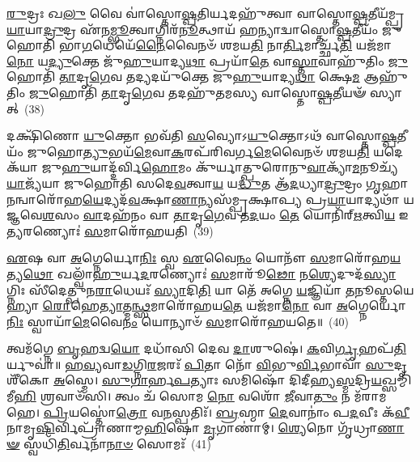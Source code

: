 \-\ul{𑌰𑍁}\-𑌦𑍍𑌰𑌃 𑌖\-\ul{𑌲𑍁} 𑌵𑍈 𑌵𑌾॑𑌸𑍍𑌤𑍋\-\ul{𑌷𑍍𑌪}\-𑌤𑌿𑌰𑍍𑌯𑌦𑌹𑍁᳴𑌤𑍍𑌵𑌾 𑌵𑌾𑌸𑍍𑌤𑍋\-\ul{𑌷𑍍𑌪}\-𑌤𑍀𑌯᳴𑌮𑍍𑌪𑍍𑌰\-\ul{𑌯𑌾}\-𑌯𑌾\-\ul{𑌦𑍍𑌰𑍁}\-𑌦𑍍𑌰 𑌏᳴𑌨\-\ul{𑌮𑍍𑌭𑍂}\-𑌤𑍍𑌵𑌾𑌗𑍍𑌨𑌿𑌰᳴\-\ul{𑌨𑍂}\-𑌤𑍍𑌥𑌾𑌯᳴ 𑌹𑌨𑍍𑌯𑌾𑌦𑍍𑌵𑌾𑌸𑍍𑌤𑍋\-\ul{𑌷𑍍𑌪}\-𑌤𑍀𑌯𑌂᳴ 𑌜𑍁𑌹𑍋𑌤𑌿 𑌭𑌾\-\ul{𑌗}\-𑌧𑍇𑌯𑍇᳴\-\ul{𑌨𑍈}\-𑌵𑍈𑌨𑍞᳴ 𑌶𑌮𑌯\-\ul{𑌤𑌿} 𑌨𑌾\-\ul{𑌰𑍍𑌤𑌿}\-𑌮𑌾𑌰𑍍𑌚𑍍𑌛᳴\-\ul{𑌤𑌿} 𑌯𑌜᳴𑌮𑌾\-\ul{𑌨𑍋} 𑌯\-\ul{𑌦𑍍𑌯𑍁}\-𑌕𑍍𑌤𑍇 𑌜𑍁᳴\-\ul{𑌹𑍁}\-𑌯𑌾𑌦𑍍𑌯\-\ul{𑌥𑌾} 𑌪𑍍𑌰𑌯𑌾᳴\-\ul{𑌤𑍇} 𑌵𑌾\-\ul{𑌸𑍍𑌤𑌾}\-𑌵𑌾𑌹𑍁᳴𑌤𑌿𑌂 \ul{𑌜𑍁}\-𑌹𑍋𑌤𑌿᳴ \ul{𑌤𑌾}\-𑌦𑍃\-\ul{𑌗𑍇}\-𑌵 𑌤𑌦𑍍𑌯𑌦𑌯𑍁᳴𑌕𑍍𑌤𑍇 𑌜𑍁\-\ul{𑌹𑍁}\-𑌯𑌾𑌦𑍍𑌯\-\ul{𑌥𑌾} 𑌕𑍍𑌷𑍇\-\ul{𑌮} 𑌆𑌹𑍁᳴𑌤𑌿𑌂 \ul{𑌜𑍁}\-𑌹𑍋𑌤𑌿᳴ \ul{𑌤𑌾}\-𑌦𑍃\-\ul{𑌗𑍇}\-𑌵 𑌤𑌦𑌹𑍁᳴𑌤𑌮𑌸𑍍𑌯 𑌵𑌾𑌸𑍍𑌤𑍋\-\ul{𑌷𑍍𑌪}\-𑌤𑍀𑌯𑍟᳴ 𑌸𑍍𑌯𑌾𑌤𑍍~(38)

𑌦𑌕𑍍𑌷𑌿᳴𑌣𑍋 \ul{𑌯𑍁}\-𑌕𑍍𑌤𑍋 𑌭𑌵᳴𑌤𑌿 \ul{𑌸}\-𑌵𑍍𑌯𑍋\-𑌽\-\ul{𑌯𑍁}\-𑌕𑍍𑌤𑍋\-𑌽𑌥᳴ 𑌵𑌾𑌸𑍍𑌤𑍋\-\ul{𑌷𑍍𑌪}\-𑌤𑍀𑌯𑌂᳴ 𑌜𑍁𑌹𑍋\-\ul{𑌤𑍍𑌯𑍁}\-𑌭𑌯᳴\-\ul{𑌮𑍇}\-𑌵𑌾\-\ul{𑌕}\-𑌰𑌪᳴𑌰𑌿𑌵𑌰𑍍𑌗\-\ul{𑌮𑍇}\-𑌵𑍈𑌨𑍞᳴ 𑌶𑌮𑌯\-\ul{𑌤𑌿} 𑌯𑌦𑍇𑌕᳴𑌯𑌾 𑌜𑍁\-\ul{𑌹𑍁}\-𑌯𑌾𑌦𑍍𑌦᳴𑌰𑍍𑌵𑌿\-\ul{𑌹𑍋}\-𑌮𑌂 𑌕𑍁᳴𑌰𑍍𑌯𑌾𑌤𑍍𑌪𑍁𑌰𑍋𑌨𑍁\-\ul{𑌵𑌾}\-𑌕𑍍𑌯𑌾᳴\-\ul{𑌮}\-𑌨𑍂𑌚𑍍𑌯᳴ \ul{𑌯𑌾}\-𑌜𑍍𑌯᳴𑌯𑌾 𑌜𑍁𑌹𑍋𑌤𑌿 𑌸𑌦𑍇\-\ul{𑌵}\-𑌤𑍍𑌵𑌾\-\ul{𑌯} 𑌯\-\ul{𑌦𑍍𑌧𑍁}\-𑌤 𑌆᳴\-\ul{𑌦}\-𑌧𑍍𑌯𑌾\-\ul{𑌦𑍍𑌰𑍁}\-𑌦𑍍𑌰𑌂 \ul{𑌗𑍃}\-𑌹𑌾\-\ul{𑌨}\-𑌨𑍍𑌵𑌾𑌰𑍋᳴𑌹\-\ul{𑌯𑍇}\-𑌦𑍍𑌯𑌦᳴\-\ul{𑌵}\-\-𑌕𑍍𑌷𑌾\-\ul{𑌣𑌾}\-𑌨𑍍𑌯𑌸᳴𑌮𑍍𑌪𑍍𑌰𑌕𑍍𑌷𑌾𑌪𑍍𑌯 𑌪𑍍𑌰\-\ul{𑌯𑌾}\-𑌯𑌾𑌦𑍍𑌯𑌥𑌾᳴ 𑌯𑌜𑍍𑌞𑌵𑍇\-\ul{𑌶}\-𑌸𑌂 \ul{𑌵𑌾}\-𑌦𑌹᳴𑌨𑌂 𑌵𑌾 \ul{𑌤𑌾}\-𑌦𑍃\-\ul{𑌗𑍇}\-𑌵 𑌤\-\ul{𑌦}\-𑌯𑌂 \ul{𑌤𑍇} 𑌯𑍋𑌨𑌿᳴𑌰𑍍\mbox{}\-\ul{𑌋}\-𑌤𑍍𑌵𑌿\-\ul{𑌯} 𑌇\-\ul{𑌤𑍍𑌯}\-𑌰𑌣𑍍𑌯𑍋𑌃॑ \ul{𑌸}\-𑌮𑌾𑌰𑍋᳴𑌹𑌯𑌤𑌿~(39)

\-\ul{𑌏}\-𑌷 𑌵𑌾 \ul{𑌅}\-𑌗𑍍𑌨𑍇𑌰𑍍𑌯𑍋\-\ul{𑌨𑌿𑌃} 𑌸𑍍𑌵 \ul{𑌏}\-𑌵𑍈\-\ul{𑌨𑌂} 𑌯𑍋𑌨𑍗᳴ \ul{𑌸}\-𑌮𑌾𑌰𑍋᳴𑌹\-\ul{𑌯}\-𑌤𑍍𑌯\-\ul{𑌥𑍋} 𑌖𑌲𑍍𑌵𑌾᳴\-\ul{𑌹𑍁}\-𑌰𑍍𑌯\-\ul{𑌦}\-𑌰𑌣𑍍𑌯𑍋𑌃॑ \ul{𑌸}\-𑌮𑌾𑌰𑍂᳴\-\ul{𑌢𑍋} 𑌨\-\ul{𑌶𑍍𑌯𑍇}\-𑌦𑍁𑌦᳴\-\ul{𑌸𑍍𑌯𑌾}\-𑌗𑍍𑌨𑌿𑌃 𑌸𑍀᳴𑌦𑍇𑌤𑍍𑌪𑍁𑌨\-\ul{𑌰𑌾}\-𑌧𑍇𑌯𑌃᳴ \ul{𑌸𑍍𑌯𑌾}\-𑌦𑌿\-\ul{𑌤𑌿} 𑌯𑌾 𑌤𑍇᳴ 𑌅𑌗𑍍𑌨𑍇 \ul{𑌯}\-𑌜𑍍𑌞𑌿𑌯𑌾᳴ \ul{𑌤}\-𑌨𑍂𑌸𑍍𑌤𑌯𑍇𑌹𑍍𑌯𑌾 \ul{𑌰𑍋}\-𑌹𑍇\-\ul{𑌤𑍍𑌯𑌾}\-𑌤𑍍𑌮\-\ul{𑌨𑍍𑌥𑍍𑌸}\-𑌮𑌾𑌰𑍋᳴𑌹𑌯\-\ul{𑌤𑍇} 𑌯𑌜᳴𑌮𑌾\-\ul{𑌨𑍋} 𑌵𑌾 \ul{𑌅}\-𑌗𑍍𑌨𑍇𑌰𑍍𑌯𑍋\-\ul{𑌨𑌿𑌃} 𑌸𑍍𑌵𑌾𑌯𑌾᳴\-\ul{𑌮𑍇}\-𑌵𑍈\-\ul{𑌨𑌂} 𑌯𑍋𑌨𑍍𑌯𑌾𑍞᳴ \ul{𑌸}\-𑌮𑌾𑌰𑍋᳴𑌹𑌯𑌤𑍇॥~(40)

{\anuvakamend[{\-\ul{𑌧}\-\-\ul{𑌤𑍍𑌤𑍇}\-\-𑌽\-\ul{𑌰𑍍𑌵𑌾}\-𑌚𑍀𑌨𑍟᳴ 𑌸𑍍𑌯𑌾\-\ul{𑌥𑍍𑌸}\-𑌮𑌾𑌰𑍋᳴𑌹𑌯\-\ul{𑌤𑌿} 𑌪𑌞𑍍𑌚᳴𑌚𑌤𑍍𑌵𑌾𑌰𑌿𑍞𑌶𑌚𑍍𑌚}]}%

𑌤𑍍𑌵𑌮᳴𑌗𑍍𑌨𑍇 \ul{𑌬𑍃}\-𑌹𑌦𑍍𑌵\-\ul{𑌯𑍋} 𑌦𑌧𑌾᳴𑌸𑌿 𑌦𑍇𑌵 \ul{𑌦𑌾}\-𑌶𑍁𑌷𑍇॑। \ul{𑌕}\-𑌵𑌿\-\ul{𑌰𑍍𑌗𑍃}\-𑌹𑌪᳴\-\ul{𑌤𑌿}\-𑌰𑍍𑌯𑍁𑌵𑌾॑॥ \ul{𑌹}\-\-\ul{𑌵𑍍𑌯}\-𑌵𑌾\-\ul{𑌡}\-𑌗𑍍𑌨𑌿\-\ul{𑌰}\-𑌜𑌰𑌃᳴ \ul{𑌪𑌿}\-𑌤𑌾 𑌨𑍋᳴ \ul{𑌵𑌿}\-𑌭𑍁\-\ul{𑌰𑍍𑌵𑌿}\-𑌭𑌾𑌵𑌾᳴ \ul{𑌸𑍁}\-𑌦𑍃𑌶𑍀᳴𑌕𑍋 \ul{𑌅}\-𑌸𑍍𑌮𑍇। \ul{𑌸𑍁}\-\-\ul{𑌗𑌾}\-𑌰𑍍\mbox{}\-\ul{𑌹}\-\-\ul{𑌪}\-𑌤𑍍𑌯𑌾𑌃 𑌸𑌮𑌿𑌷𑍋᳴ 𑌦𑌿𑌦𑍀𑌹𑍍𑌯\-\ul{𑌸𑍍𑌮}\-𑌦𑍍𑌰𑌿\-\ul{𑌯}\-𑌖𑍍𑌸𑌮𑍍𑌮𑌿᳴𑌮𑍀\-\ul{𑌹𑌿} 𑌶𑍍𑌰𑌵𑌾𑍞᳴𑌸𑌿। 𑌤𑍍𑌵𑌂 𑌚᳴ 𑌸𑍋𑌮 \ul{𑌨𑍋} 𑌵𑌶𑍋᳴ \ul{𑌜𑍀}\-𑌵𑌾\-\ul{𑌤𑍁𑌂} 𑌨 𑌮᳴𑌰𑌾𑌮𑌹𑍇। \ul{𑌪𑍍𑌰𑌿}\-𑌯𑌸𑍍𑌤𑍋॑\-\ul{𑌤𑍍𑌰𑍋} 𑌵\-\ul{𑌨}\-𑌸𑍍𑌪𑌤𑌿𑌃᳴। \ul{𑌬𑍍𑌰}\-𑌹𑍍𑌮𑌾 \ul{𑌦𑍇}\-𑌵𑌾𑌨𑌾𑌂॑ 𑌪\-\ul{𑌦}\-𑌵𑍀𑌃 𑌕᳴\-\ul{𑌵𑍀}\-𑌨𑌾𑌮𑍃\-\ul{𑌷𑌿}\-𑌰𑍍𑌵𑌿𑌪𑍍𑌰𑌾᳴𑌣𑌾𑌮𑍍𑌮\-\ul{𑌹𑌿}\-𑌷𑍋 \ul{𑌮𑍃}\-𑌗𑌾𑌣𑌾॑𑌮𑍍। \ul{𑌶𑍍𑌯𑍇}\-𑌨𑍋 𑌗𑍃᳴𑌧𑍍𑌰𑌾\-\ul{𑌣𑌾}\-\-\ul{𑍟} 𑌸𑍍𑌵𑌧𑌿᳴\-\ul{𑌤𑌿}\-𑌰𑍍𑌵𑌨𑌾᳴\-\ul{𑌨𑌾}\-\-\ul{𑍞} 𑌸𑍋𑌮𑌃᳴~(41)

